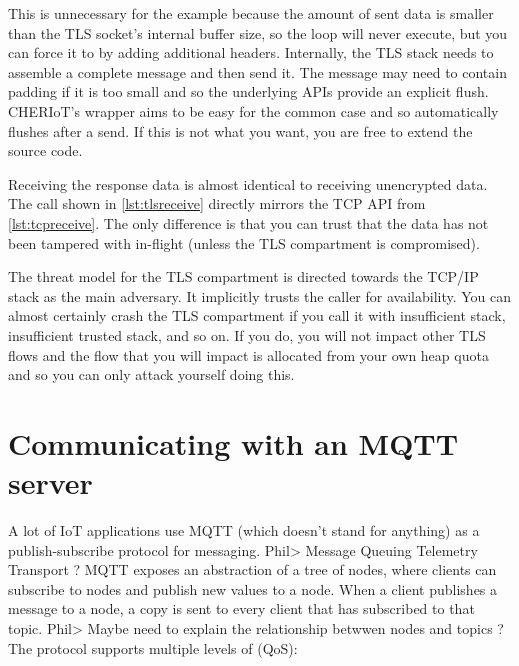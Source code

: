 This is unnecessary for the example because the amount of sent data is smaller than the TLS socket's internal buffer size, so the loop will never execute, but you can force it to by adding additional headers.
Internally, the TLS stack needs to assemble a complete message and then send it.
The message may need to contain padding if it is too small and so the underlying APIs provide an explicit flush.
CHERIoT's wrapper aims to be easy for the common case and so automatically flushes after a send.
If this is not what you want, you are free to extend the source code.

\codelisting[filename=examples/tls/https.cc,marker=send,label=lst:tlssend,caption="Sending data over a TLS connection."]{}

Receiving the response data is almost identical to receiving unencrypted data.
The call shown in \ref{lst:tlsreceive} directly mirrors the TCP API from \ref{lst:tcpreceive}.
The only difference is that you can trust that the data has not been tampered with in-flight (unless the TLS compartment is compromised).

\codelisting[filename=examples/tls/https.cc,marker=receive,label=lst:tlsreceive,caption="Receiving data over a TLS connection."]{}

\begin{caution}
The threat model for the TLS compartment is directed towards the TCP/IP stack as the main adversary.
It implicitly trusts the caller for availability.
You can almost certainly crash the TLS compartment if you call it with insufficient stack, insufficient trusted stack, and so on.
If you do, you will not impact other TLS flows and the flow that you will impact is allocated from your own heap quota and so you can only attack yourself doing this.
\end{caution}

\section[label=mqtt]{Communicating with an MQTT server}

A lot of IoT applications use MQTT (which doesn't stand for anything) as a publish-subscribe protocol for messaging.
Phil> Message Queuing Telemetry Transport ?
MQTT exposes an abstraction of a tree of nodes, where clients can subscribe to nodes and publish new values to a node.
When a client publishes a message to a node, a copy is sent to every client that has subscribed to that topic.
Phil> Maybe need to explain the relationship betwwen nodes and topics ?
The protocol supports multiple levels of  (QoS):

